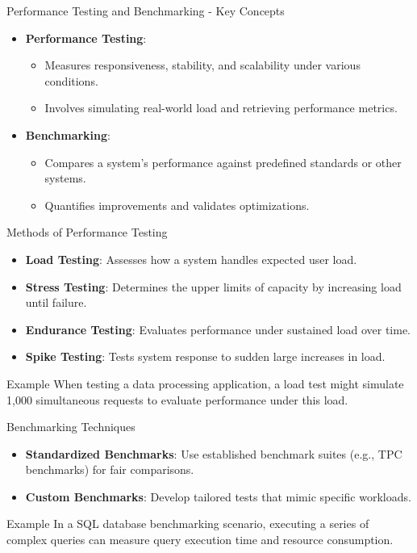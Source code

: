 \documentclass[aspectratio=169]{beamer}
\begin{document}
\begin{frame}[fragile]{Performance Testing and Benchmarking - Key Concepts}
  \begin{itemize}
    \item \textbf{Performance Testing}:
      \begin{itemize}
        \item Measures responsiveness, stability, and scalability under various conditions.
        \item Involves simulating real-world load and retrieving performance metrics.
      \end{itemize}
      
    \item \textbf{Benchmarking}:
      \begin{itemize}
        \item Compares a system's performance against predefined standards or other systems.
        \item Quantifies improvements and validates optimizations.
      \end{itemize}
  \end{itemize}
\end{frame}

\begin{frame}[fragile]{Methods of Performance Testing}
  \begin{itemize}
    \item \textbf{Load Testing}: Assesses how a system handles expected user load.
    \item \textbf{Stress Testing}: Determines the upper limits of capacity by increasing load until failure.
    \item \textbf{Endurance Testing}: Evaluates performance under sustained load over time.
    \item \textbf{Spike Testing}: Tests system response to sudden large increases in load.
  \end{itemize}

  \begin{block}{Example}
    When testing a data processing application, a load test might simulate 1,000 simultaneous requests to evaluate performance under this load.
  \end{block}
\end{frame}

\begin{frame}[fragile]{Benchmarking Techniques}
  \begin{itemize}
    \item \textbf{Standardized Benchmarks}: Use established benchmark suites (e.g., TPC benchmarks) for fair comparisons.
    \item \textbf{Custom Benchmarks}: Develop tailored tests that mimic specific workloads.
  \end{itemize}

  \begin{block}{Example}
    In a SQL database benchmarking scenario, executing a series of complex queries can measure query execution time and resource consumption.
  \end{block}
\end{frame}
\end{document}
